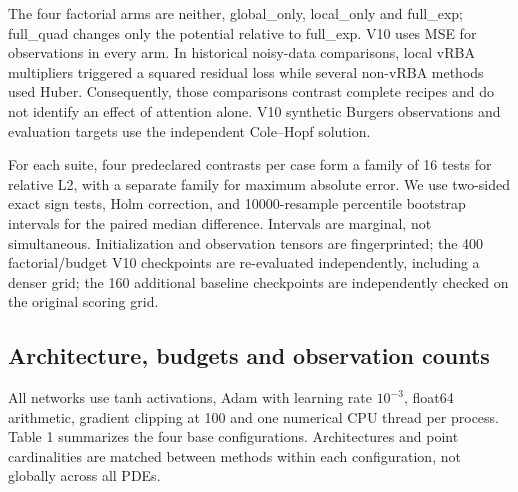 \documentclass[
  11pt,
]{article}
\begin{document}
The four factorial arms are neither, global\_only, local\_only and
full\_exp; full\_quad changes only the potential relative to full\_exp.
V10 uses MSE for observations in every arm. In historical noisy-data
comparisons, local vRBA multipliers triggered a squared residual loss
while several non-vRBA methods used Huber. Consequently, those
comparisons contrast complete recipes and do not identify an effect of
attention alone. V10 synthetic Burgers observations and evaluation
targets use the independent Cole--Hopf solution.

For each suite, four predeclared contrasts per case form a family of 16
tests for relative L2, with a separate family for maximum absolute
error. We use two-sided exact sign tests, Holm correction, and
10000-resample percentile bootstrap intervals for the paired median
difference. Intervals are marginal, not simultaneous. Initialization and
observation tensors are fingerprinted; the 400 factorial/budget V10
checkpoints are re-evaluated independently, including a denser grid; the
160 additional baseline checkpoints are independently checked on the
original scoring grid.

\hypertarget{architecture-budgets-and-observation-counts}{%
\subsection{Architecture, budgets and observation
counts}\label{architecture-budgets-and-observation-counts}}

All networks use tanh activations, Adam with learning rate \(10^{-3}\),
float64 arithmetic, gradient clipping at 100 and one numerical CPU
thread per process. Table 1 summarizes the four base configurations.
Architectures and point cardinalities are matched between methods within
each configuration, not globally across all PDEs.

\begingroup\small
\end{document}
